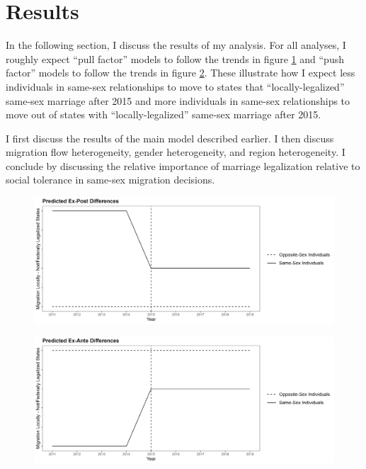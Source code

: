 \documentclass[12pt,letterpaper]{article}
\begin{document}
\begin{landscape}
\begin{centering}
\begin{scriptsize}

\end{scriptsize}
\end{centering}
\end{landscape}


\clearpage

\section{Results}
In the following section, I discuss the results of my analysis. For all analyses, I roughly expect “pull factor” models to follow the trends in figure \ref{fig: ex_post_diffs} and “push factor” models to follow the trends in figure \ref{fig: ex_ante_diffs}. These illustrate how I expect less individuals in same-sex relationships to move to states that “locally-legalized” same-sex marriage after 2015 and more individuals in same-sex relationships to move out of states with “locally-legalized” same-sex marriage after 2015. 

I first discuss the results of the main model described earlier. I then discuss migration flow heterogeneity, gender heterogeneity, and region heterogeneity. I conclude by discussing the relative importance of marriage legalization relative to social tolerance in same-sex migration decisions.

\begin{centering}
\begin{figure}
    \centering
    \includegraphics[width=0.75\linewidth]{outputs/summary_stats/ex_post_diffs.png}
    \caption{}
    \label{fig: ex_post_diffs}
\end{figure}

\begin{figure}
    \centering
    \includegraphics[width=0.75\linewidth]{outputs/summary_stats/ex_ante_diffs.png}
    \caption{}
    \label{fig: ex_ante_diffs}
\end{figure}
\end{centering}
\end{document}
